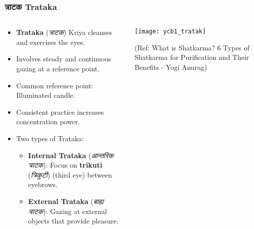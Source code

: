 \begin{frame}[fragile]\frametitle{त्राटक Trataka}
\begin{columns}
    \begin{column}[T]{0.5\linewidth}
     \begin{itemize}
          \item \textbf{Trataka} (\textit{त्राटक}) Kriya cleanses and exercises the eyes.
          \item Involves steady and continuous gazing at a reference point.
          \item Common reference point: Illuminated candle.
          \item Consistent practice increases concentration power.
          \item Two types of Trataka:
            \begin{itemize}
              \item \textbf{Internal Trataka} (\textit{आन्तरिक त्राटक}): Focus on \textbf{trikuti} (\textit{त्रिकुटी}) (third eye) between eyebrows.
              \item \textbf{External Trataka} (\textit{बाह्य त्राटक}): Gazing at external objects that provide pleasure.
            \end{itemize}
      \end{itemize}
    \end{column}
    \begin{column}[T]{0.5\linewidth}
        \begin{center}
        \texttt{[image: ycb1\_tratak]}
		
		{\tiny (Ref: What is Shatkarma? 6 Types of Shatkarma for Purification and Their Benefits - Yogi Anurag)}	
        \end{center}	
    \end{column}
\end{columns}	  
\end{frame}

